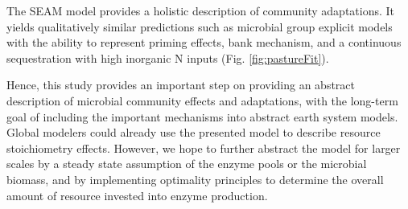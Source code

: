 The SEAM model provides a holistic description of community adaptations. It
yields qualitatively similar predictions such as microbial group explicit models
with the ability to represent priming effects, bank mechanism, and
a continuous sequestration with high inorganic N inputs (Fig. \ref{fig:pastureFit}).

Hence, this study provides an important step on providing an abstract
description of microbial community effects and adaptations, with the long-term
goal of including the important mechanisms into abstract earth system models.
Global modelers could already use the presented model to describe resource
stoichiometry effects. However, we hope to further abstract the model for larger
scales by a steady state assumption of the enzyme pools or the microbial
biomass, and by implementing optimality principles to determine the
overall amount of resource invested into enzyme production.


